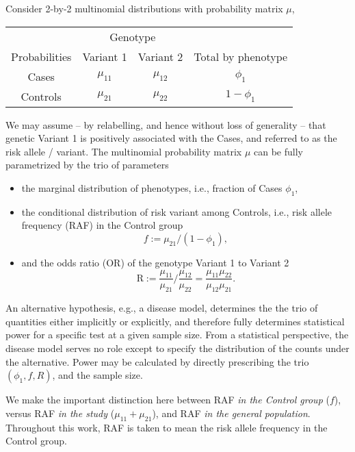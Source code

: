 Consider 2-by-2 multinomial distributions with probability matrix $\mu$,
\begin{center}
    \begin{tabular}{cccc}
    \hline
    & \multicolumn{2}{c}{Genotype} \\
    \cline{2-3}
    Probabilities & Variant 1 & Variant 2 & Total by phenotype \\
    \hline
    Cases & $\mu_{11}$ & $\mu_{12}$ & $\phi_1$ \\
    Controls & $\mu_{21}$ & $\mu_{22}$ & $1-\phi_1$ \\
    \hline
    \end{tabular}
\end{center}
We may assume -- by relabelling, and hence without loss of generality -- that genetic Variant 1 is positively associated with the Cases, and referred to as the risk allele / variant. 
The multinomial probability matrix $\mu$ can be fully parametrized by the trio of parameters
\begin{itemize}
    \item the marginal distribution of phenotypes, i.e., fraction of Cases $\phi_1$,
    \item the conditional distribution of risk variant among Controls, i.e., risk allele frequency (RAF) in the Control group 
    \begin{equation} \label{eq:risk-allele-frequency}
    f := \mu_{21}/(1-\phi_1),
    \end{equation}
    \item and the odds ratio (OR) of the genotype Variant 1 to Variant 2
    \begin{equation} \label{eq:odds-ratio}
    \text{R} := \frac{\mu_{11}}{\mu_{21}}\Big/\frac{\mu_{12}}{\mu_{22}}
    = \frac{\mu_{11}\mu_{22}}{\mu_{12}\mu_{21}}.
    \end{equation}
\end{itemize}

An alternative hypothesis, e.g., a disease model, determines the the trio of quantities either implicitly or explicitly,
and therefore fully determines statistical power for a specific test at a given sample size.
From a statistical perspective, the disease model serves no role except to specify the distribution of the counts under the alternative.
Power may be calculated by directly prescribing the trio $(\phi_1, f, R)$, and the sample size.

We make the important distinction here between RAF \emph{in the Control group} ($f$), versus RAF \emph{in the study} ($\mu_{11}+\mu_{21}$), and RAF \emph{in the general population}.
Throughout this work, RAF is taken to mean the risk allele frequency in the Control group.

